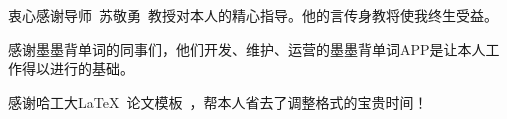 \begin{acknowledgements}
衷心感谢导师~苏敬勇~教授对本人的精心指导。他的言传身教将使我终生受益。

感谢墨墨背单词的同事们，他们开发、维护、运营的墨墨背单词APP是让本人工作得以进行的基础。

感谢哈工大\LaTeX\ 论文模板\hithesis\ ，帮本人省去了调整格式的宝贵时间！

\end{acknowledgements}
